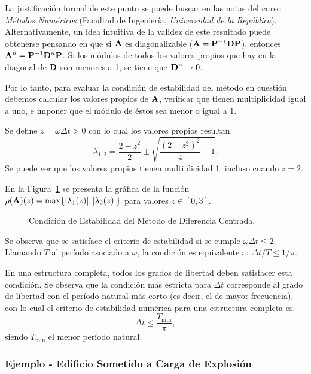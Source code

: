La justificación formal de este punto se puede buscar en las notas del curso \textit{Métodos Numéricos} (Facultad de Ingeniería, \textit{Universidad de la República}). %
%
Alternativamente, un idea intuitiva de la validez de este resultado puede obtenerse pensando en que si ${\bf A}$ es diagonalizable (${\bf A} = {\bf P}^{-1}{\bf D} {\bf P}$), entonces ${\bf A}^n = {\bf P}^{-1} {\bf D}^n {\bf P}$. Si los módulos de todos los valores propios que hay en la diagonal de ${\bf D}$ son menores a 1, se tiene que ${\bf D}^n\rightarrow 0$.

Por lo tanto, para evaluar la condición de estabilidad del método en cuestión debemos calcular los valores propios de ${\bf A}$, verificar que tienen multiplicidad igual a uno, e imponer que el módulo de éstos sea menor o igual a 1. 

Se define $z=\omega \Delta t>0$ con lo cual los valores propios resultan:
%
\begin{equation}\label{VProps}
\lambda_{1,2} = \frac{2-z^2}{2}\pm\sqrt{\frac{(2-z^2)^2}{4}-1}.
\end{equation}
%
Se puede ver que los valores propios tienen multiplicidad 1, incluso cuando $z=2$. %

En la Figura~\ref{fig:StabDifCentr} se presenta la gráfica de la función $\rho({\bf A})(z)=\max\{|\lambda_1(z)|,|\lambda_2(z)|\}$ para valores $z\in[0,3]$.

\begin{figure}[htb]
	\centering
	\resizebox{.58\linewidth}{!}{}
	\caption{Condición de Estabilidad del Método de Diferencia Centrada.}
	\label{fig:StabDifCentr}
\end{figure}

Se observa que se satisface el criterio de estabilidad si se cumple $\omega \Delta t \leq 2$. Llamando $T$ al período asociado a $\omega$, la condición es equivalente a: $\Delta t/ T \leq 1/\pi$.

En una estructura completa, todos los grados de libertad deben satisfacer esta condición. Se observa que la condición más estricta para $\Delta t$ corresponde al grado de libertad con el período natural más corto (es decir, el de mayor frecuencia), con lo cual el criterio de estabilidad numérica para una estructura completa es:
%
\begin{equation}
	\Delta t \leq \frac{T_{\text{min}}}{\pi},
\end{equation}
%
siendo $T_{\text{min}}$ el menor período natural.




\subsubsection{Ejemplo - Edificio Sometido a Carga de Explosión}\label{EjBlast}

